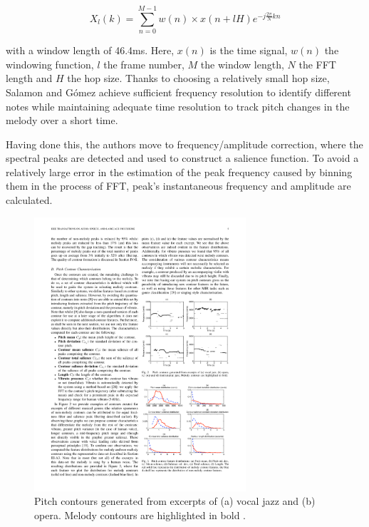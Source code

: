 \begin{equation}
X_{l}(k) = \sum_{n=0}^{M-1} w(n) \times x(n + lH) e^{-j\frac{2 \pi}{N}kn}
\end{equation}

with a window length of 46.4ms. Here, $x(n)$ is the time signal, $w(n)$ the windowing function, $l$ the frame number, $M$ the window length, $N$ the FFT length and $H$ the hop size. Thanks to choosing a relatively small hop size, Salamon and G\'{o}mez achieve sufficient frequency resolution to identify different notes while maintaining adequate time resolution to track pitch changes in the melody over a short time. 

Having done this, the authors move to frequency/amplitude correction, where the spectral peaks are detected and used to construct a salience function. To avoid a relatively large error in the estimation of the peak frequency caused by binning them in the process of FFT, peak’s instantaneous frequency and amplitude are calculated. 

\begin{figure}[b]
  \centering
    \includegraphics[width=0.7\textwidth]{Figures/pitchcontour}
      \caption{Pitch contours generated from excerpts of (a) vocal jazz and (b) opera. Melody contours are highlighted in bold \cite{salamon}.}
\label{fig:pitchcontours}
\end{figure}

